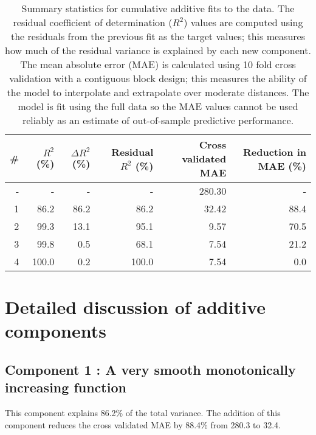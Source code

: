 \documentclass{article} %
\begin{document}
\begin{table}[htb]
\begin{center}
{\small
\begin{tabular}{|r|rrrrr|}
\hline
\bf{\#} & {$R^2$ (\%)} & {$\Delta R^2$ (\%)} & {Residual $R^2$ (\%)} & {Cross validated MAE} & Reduction in MAE (\%)\\
\hline
- & - & - & - & 280.30 & -\\

1 & 86.2 & 86.2 & 86.2 & 32.42 & 88.4\\

2 & 99.3 & 13.1 & 95.1 & 9.57 & 70.5\\

3 & 99.8 & 0.5 & 68.1 & 7.54 & 21.2\\

4 & 100.0 & 0.2 & 100.0 & 7.54 & 0.0\\

\hline
\end{tabular}
\caption{
Summary statistics for cumulative additive fits to the data.
The residual coefficient of determination ($R^2$) values are computed using the residuals from the previous fit as the target values; this measures how much of the residual variance is explained by each new component.
The mean absolute error (MAE) is calculated using 10 fold cross validation with a contiguous block design; this measures the ability of the model to interpolate and extrapolate over moderate distances.
The model is fit using the full data so the MAE values cannot be used reliably as an estimate of out-of-sample predictive performance.
}
\label{table:stats}
}
\end{center}
\end{table}

\section{Detailed discussion of additive components}

\subsection{Component 1 : A very smooth monotonically increasing function}



This component explains 86.2\% of the total variance.
The addition of this component reduces the cross validated MAE by 88.4\% from 280.3 to 32.4.
\end{document}
